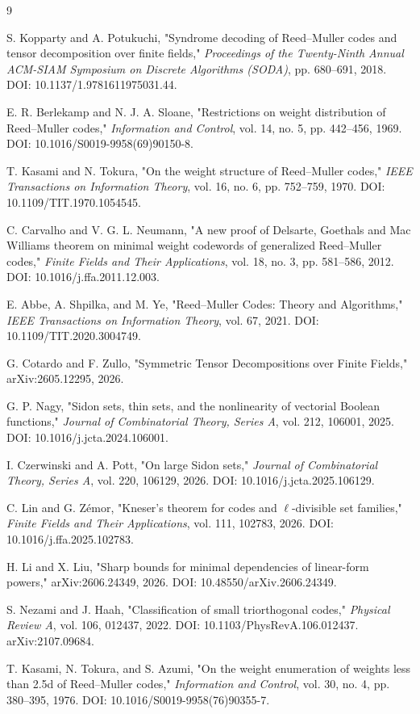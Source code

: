 \documentclass[11pt]{article}
\theoremstyle{definition}
\begin{document}
\begin{thebibliography}{9}

S. Kopparty and A. Potukuchi,
"Syndrome decoding of Reed--Muller codes and tensor decomposition over finite fields,"
\emph{Proceedings of the Twenty-Ninth Annual ACM-SIAM Symposium on Discrete Algorithms (SODA)}, pp. 680--691, 2018.
DOI: 10.1137/1.9781611975031.44.

E. R. Berlekamp and N. J. A. Sloane,
"Restrictions on weight distribution of Reed--Muller codes,"
\emph{Information and Control}, vol. 14, no. 5, pp. 442--456, 1969.
DOI: 10.1016/S0019-9958(69)90150-8.

T. Kasami and N. Tokura,
"On the weight structure of Reed--Muller codes,"
\emph{IEEE Transactions on Information Theory}, vol. 16, no. 6, pp. 752--759, 1970.
DOI: 10.1109/TIT.1970.1054545.

C. Carvalho and V. G. L. Neumann,
"A new proof of Delsarte, Goethals and Mac Williams theorem on minimal weight codewords of generalized Reed--Muller codes,"
\emph{Finite Fields and Their Applications}, vol. 18, no. 3, pp. 581--586, 2012.
DOI: 10.1016/j.ffa.2011.12.003.

E. Abbe, A. Shpilka, and M. Ye,
"Reed--Muller Codes: Theory and Algorithms,"
\emph{IEEE Transactions on Information Theory}, vol. 67, 2021.
DOI: 10.1109/TIT.2020.3004749.

G. Cotardo and F. Zullo,
"Symmetric Tensor Decompositions over Finite Fields,"
arXiv:2605.12295, 2026.


G. P. Nagy,
"Sidon sets, thin sets, and the nonlinearity of vectorial Boolean functions,"
\emph{Journal of Combinatorial Theory, Series A}, vol. 212, 106001, 2025.
DOI: 10.1016/j.jcta.2024.106001.

I. Czerwinski and A. Pott,
"On large Sidon sets,"
\emph{Journal of Combinatorial Theory, Series A}, vol. 220, 106129, 2026.
DOI: 10.1016/j.jcta.2025.106129.


C. Lin and G. Z\'emor,
"Kneser's theorem for codes and \(\ell\)-divisible set families,"
\emph{Finite Fields and Their Applications}, vol. 111, 102783, 2026.
DOI: 10.1016/j.ffa.2025.102783.


H. Li and X. Liu,
"Sharp bounds for minimal dependencies of linear-form powers,"
arXiv:2606.24349, 2026.
DOI: 10.48550/arXiv.2606.24349.


S. Nezami and J. Haah,
"Classification of small triorthogonal codes,"
\emph{Physical Review A}, vol. 106, 012437, 2022.
DOI: 10.1103/PhysRevA.106.012437.
arXiv:2107.09684.

T. Kasami, N. Tokura, and S. Azumi,
"On the weight enumeration of weights less than 2.5d of Reed--Muller codes,"
\emph{Information and Control}, vol. 30, no. 4, pp. 380--395, 1976.
DOI: 10.1016/S0019-9958(76)90355-7.

\end{thebibliography}
\end{document}
